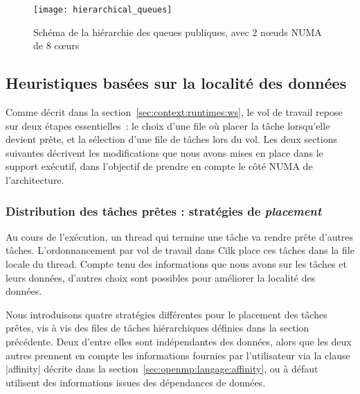 \begin{figure}[h!]
  \centering
  \texttt{[image: hierarchical\_queues]}
  \caption{Schéma de la hiérarchie des queues publiques, avec 2 nœuds NUMA de 8 cœurs}\label{fig:openmp:runtime:hierarchical_queues}
\end{figure}


\subsection{Heuristiques basées sur la localité des données}\label{sec:contrib:ws:heuristics}

Comme décrit dans la section~\ref{sec:context:runtimes:ws}, le vol de travail repose sur deux étapes essentielles~: le choix d'une file où placer la tâche lorsqu'elle devient prête, et la sélection d'une file de tâches lors du vol.
Les deux sections suivantes décrivent les modifications que nous avons mises en place dans le support exécutif, dans l'objectif de prendre en compte le côté NUMA de l'architecture.


\subsubsection{Distribution des tâches prêtes : stratégies de \emph{placement}}
\label{sec:openmp:runtime:push}

Au cours de l'exécution, un thread qui termine une tâche va rendre prête d'autres tâches. L'ordonnancement par vol de travail dans Cilk place ces tâches dans la file locale du thread.
Compte tenu des informations que nous avons sur les tâches et leurs données, d'autres choix sont possibles pour améliorer la localité des données.

Nous introduisons quatre stratégies différentes pour le placement des tâches prêtes, vis à vis des files de tâches hiérarchiques définies dans la section précédente.
Deux d'entre elles sont indépendantes des données, alors que les deux autres prennent en compte les informations fournies par l'utilisateur via la clause |affinity| décrite dans la section~\ref{sec:openmp:langage:affinity}, ou à défaut utilisent des informations issues des dépendances de données.

